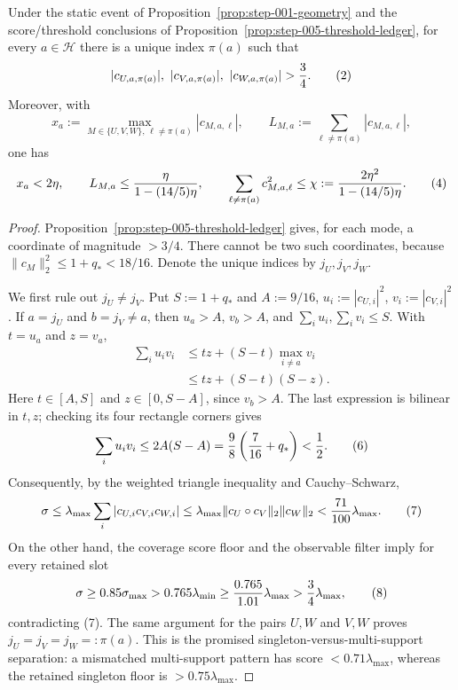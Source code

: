 \begin{proposition}\label{prop:step-006-support}
Under the static event of Proposition~\ref{prop:step-001-geometry} and the
score/threshold conclusions of Proposition~\ref{prop:step-005-threshold-ledger}, for
every \(a\in\mathcal H\) there is a unique index \(\pi(a)\) such that
\[
 |c_{U,a,\pi(a)}|,\ |c_{V,a,\pi(a)}|,\ |c_{W,a,\pi(a)}|>{3\over4}. \tag{2}
\]
Moreover, with
\[
 x_a:=\max_{M\in\{U,V,W\},\,\ell\ne\pi(a)}|c_{M,a,\ell}|,\qquad
 L_{M,a}:=\sum_{\ell\ne\pi(a)}|c_{M,a,\ell}|, \tag{3}
\]
one has
\[
 x_a<2\eta,\qquad
 L_{M,a}\le {\eta\over1-(14/5)\eta},\qquad
 \sum_{\ell\ne\pi(a)}c_{M,a,\ell}^2
 \le \chi:= {2\eta^2\over1-(14/5)\eta}. \tag{4}
\]

\begin{proof}
Proposition~\ref{prop:step-005-threshold-ledger} gives, for each mode, a
coordinate of magnitude \(>3/4\). There cannot be two such coordinates,
because \(\|c_M\|_2^2\le1+q_*<18/16\). Denote the unique indices by
\(j_U,j_V,j_W\).

We first rule out \(j_U\ne j_V\). Put \(S:=1+q_*\) and \(A:=9/16\),
\(u_i:=|c_{U,i}|^2\), \(v_i:=|c_{V,i}|^2\). If \(a=j_U\) and
\(b=j_V\ne a\), then \(u_a>A\), \(v_b>A\), and
\(\sum_i u_i,\sum_i v_i\le S\). With \(t=u_a\) and \(z=v_a\),
\[
\begin{aligned}
 \sum_i u_i v_i
 &\le tz+(S-t)\max_{i\ne a}v_i\\
 &\le tz+(S-t)(S-z).
\end{aligned} \tag{5}
\]
Here \(t\in[A,S]\) and \(z\in[0,S-A]\), since \(v_b>A\). The last
expression is bilinear in \(t,z\); checking its four rectangle corners gives
\[
 \sum_i u_i v_i\le2A(S-A)
 ={9\over8}\left({7\over16}+q_*\right)<{1\over2}. \tag{6}
\]
Consequently, by the weighted triangle inequality and Cauchy--Schwarz,
\[
 \sigma
 \le\lambda_{\max}\sum_i|c_{U,i}c_{V,i}c_{W,i}|
 \le\lambda_{\max}\|c_U\circ c_V\|_2\|c_W\|_2
 <{71\over100}\lambda_{\max}. \tag{7}
\]
On the other hand, the coverage score floor and the observable filter imply
for every retained slot
\[
 \sigma\ge0.85\sigma_{\max}>0.765\lambda_{\min}
 \ge {0.765\over1.01}\lambda_{\max}>{3\over4}\lambda_{\max}, \tag{8}
\]
contradicting (7). The same argument for the pairs \(U,W\) and \(V,W\)
proves \(j_U=j_V=j_W=:\pi(a)\). This is the promised
singleton-versus-multi-support separation: a mismatched multi-support
pattern has score \(<0.71\lambda_{\max}\), whereas the retained singleton
floor is \(>0.75\lambda_{\max}\).


\end{proof}
\end{proposition}
